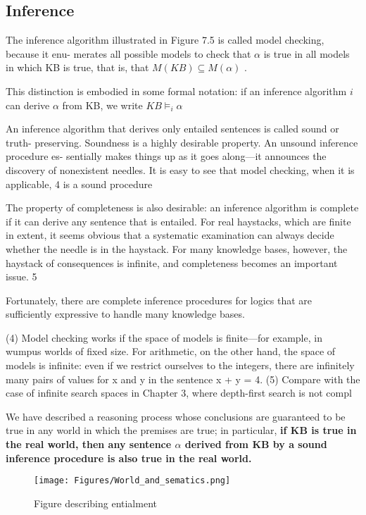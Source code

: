 \subsection{Inference}

The inference algorithm illustrated in Figure 7.5 is called model checking, because it enu-
merates all possible models to check that $\alpha$ is true in all models in which KB is true, that is,
that  $M (KB) \subseteq M (\alpha)$ .

This distinction is embodied in some formal notation: if
an inference algorithm $i$ can derive $\alpha$ from KB, we write
$KB \models_i \alpha$

An inference algorithm that derives only entailed sentences is called sound or truth-
preserving. Soundness is a highly desirable property. An unsound inference procedure es-
sentially makes things up as it goes along—it announces the discovery of nonexistent needles.
It is easy to see that model checking, when it is applicable, 4 is a sound procedure



The property of completeness is also desirable: an inference algorithm is complete if
it can derive any sentence that is entailed. For real haystacks, which are finite in extent,
it seems obvious that a systematic examination can always decide whether the needle is in
the haystack. For many knowledge bases, however, the haystack of consequences is infinite,
and completeness becomes an important issue. 5

Fortunately, there are complete inference
procedures for logics that are sufficiently expressive to handle many knowledge bases.


(4) Model checking works if the space of models is finite—for example, in wumpus worlds of fixed size. For
arithmetic, on the other hand, the space of models is infinite: even if we restrict ourselves to the integers, there
are infinitely many pairs of values for x and y in the sentence x + y = 4.
(5) Compare with the case of infinite search spaces in Chapter 3, where depth-first search is not compl

We have described a reasoning process whose conclusions are guaranteed to be true
in any world in which the premises are true; in particular, \textbf{if KB is true in the real world,
then any sentence $\alpha$ derived from KB by a sound inference procedure is also true in the real world.}


\begin{figure}[H]
    \centering
    \texttt{[image: Figures/World\_and\_sematics.png]}
    \caption{Figure describing entialment}
    \label{fig:entailment}
\end{figure}

